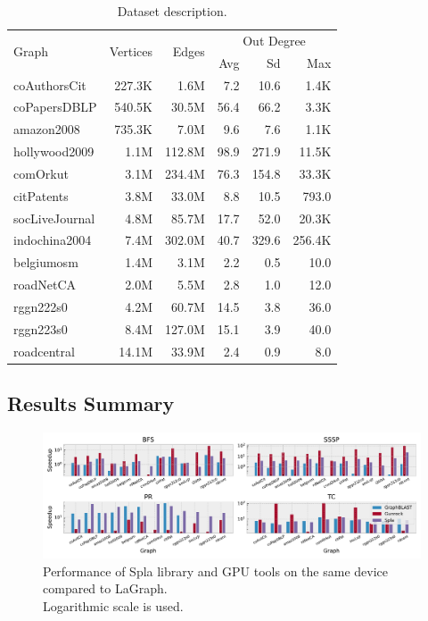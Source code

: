 \begin{table}[tbp]
\caption{Dataset description.} 
\begin{center}
    \begin{tabular}{|l|r|r|r|r|r|}
    \hline
    \multirow{2}{*}{Graph} & \multirow{2}{*}{Vertices} & \multirow{2}{*}{Edges} & \multicolumn{3}{c|}{Out Degree} \\ 
    \cline{4-6} & & & \multicolumn{1}{r|}{Avg} & \multicolumn{1}{r|}{Sd} & \multicolumn{1}{r|}{Max} \\
    \hline
    \hline
    \rowcolor{black!10} coAuthorsCit&227.3K&1.6M&7.2&10.6&1.4K\\
    \rowcolor{black!2 } coPapersDBLP&540.5K&30.5M&56.4&66.2&3.3K\\
    \rowcolor{black!10} amazon2008&735.3K&7.0M&9.6&7.6&1.1K\\
    \rowcolor{black!2 } hollywood2009&1.1M&112.8M&98.9&271.9&11.5K\\
    \rowcolor{black!10} comOrkut&3.1M&234.4M&76.3&154.8&33.3K\\
    \rowcolor{black!2 } citPatents&3.8M&33.0M&8.8&10.5&793.0\\
    \rowcolor{black!10} socLiveJournal&4.8M&85.7M&17.7&52.0&20.3K\\
    \rowcolor{black!2 } indochina2004&7.4M&302.0M&40.7&329.6&256.4K\\
    \hline
    \rowcolor{black!10} belgiumosm&1.4M&3.1M&2.2&0.5&10.0\\
    \rowcolor{black!2 } roadNetCA&2.0M&5.5M&2.8&1.0&12.0\\
    \rowcolor{black!10} rggn222s0&4.2M&60.7M&14.5&3.8&36.0\\
    \rowcolor{black!2 } rggn223s0&8.4M&127.0M&15.1&3.9&40.0\\
    \rowcolor{black!10} roadcentral&14.1M&33.9M&2.4&0.9&8.0\\
    \hline
    \end{tabular}
    \label{dataset:info}
\end{center}
\end{table}

\subsection{Results Summary}

\begin{figure}[tbp]
\centering
\includegraphics[width=1.0\linewidth]{plots/rq1_rel.pdf}
\caption{Performance of Spla library and GPU tools on the same device compared to LaGraph.\\ Logarithmic scale is used.}
\label{fig:rq1_chart}
\end{figure}

